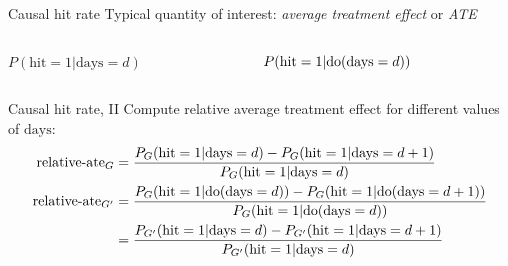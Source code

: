 \begin{frame}{Causal hit rate}
    Typical quantity of interest: \emph{average treatment effect} or \emph{ATE}
    \begin{columns}[T] %
        \begin{column}{.48\textwidth}
            $P(\textrm{hit}=1 | \textrm{days}=d)$\newline

            \newline\newline
        \end{column}%
        \begin{column}{.48\textwidth}
            $P(\textrm{hit}=1 | \mathrm{do}(\textrm{days}=d))$\newline

            \newline \newline
        \end{column}%
    \end{columns}
\end{frame}

\begin{frame}{Causal hit rate, II}
    Compute relative average treatment effect for different values of $\textrm{days}$:
    \begin{align*}
        \textrm{relative-ate}_G &= \frac{
            P_G(\textrm{hit}=1 | \textrm{days}=d) - P_G(\textrm{hit}=1 | \textrm{days}=d+1)
        }{P_G(\textrm{hit}=1 | \textrm{days}=d)} \\
        \textrm{relative-ate}_{G'} &= \frac{
            P_G(\textrm{hit}=1 | \mathrm{do}(\textrm{days}=d)) - P_G(\textrm{hit}=1 | \mathrm{do}(\textrm{days}=d+1))
        }{P_G(\textrm{hit}=1 | \mathrm{do}(\textrm{days}=d))} \\
        & = \frac{
            P_{G'}(\textrm{hit}=1 | \textrm{days}=d) - P_{G'}(\textrm{hit}=1 | \textrm{days}=d+1)
        }{P_{G'}(\textrm{hit}=1 | \textrm{days}=d)}
    \end{align*}
    \begin{center}
        
    \end{center}
\end{frame}


